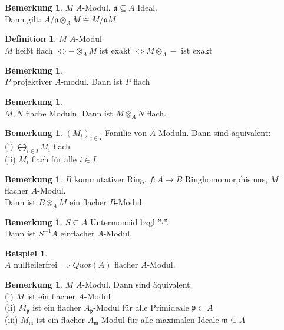 \documentclass[10pt,a4paper,numbers=endperiod]{scrreprt}
\theoremstyle{definition}
\newtheorem{defi}[satz]{Definition}
\newtheorem{bem}[satz]{Bemerkung}
\newtheorem{bsp}[satz]{Beispiel}
\begin{document}
\begin{bem}
	$M$ $A$-Modul, $\mathfrak{a} \subseteq A$ Ideal.\\
	Dann gilt: $A/\mathfrak{a} \otimes_A M \cong M/\mathfrak{a}M$
\end{bem}

\begin{defi}
	$M$ $A$-Modul\\
	$M$ heißt flach $\Leftrightarrow -\otimes_AM$ ist exakt $\Leftrightarrow M \otimes_A-$ ist exakt
\end{defi}

\begin{bem}
	$ $\\
	$P$ projektiver $A$-modul. Dann ist $P$ flach
\end{bem}

\begin{bem}
	$ $\\
	$M, N$ flache Moduln. Dann ist $M \otimes_A N$ flach.
\end{bem}

\begin{bem}
	$(M_i)_{i \in I}$ Familie von $A$-Moduln. Dann sind äquivalent:\\
	(i) $\bigoplus_{i \in I} M_i$ flach\\
	(ii) $M_i$ flach für alle $i \in I$
\end{bem}

\begin{bem}
	$B$ kommutativer Ring, $f: A \to B$ Ringhomomorphismus, $M$ flacher $A$-Modul.\\
	Dann ist $B \otimes_A M$ ein flacher $B$-Modul.
\end{bem}

\begin{bem}
	$S \subseteq A$ Untermonoid bzgl ''$\cdot$''.\\
	Dann ist $S^{-1}A$ einflacher $A$-Modul.
\end{bem}

\begin{bsp}
	$ $\\
	$A$ nullteilerfrei $\Rightarrow Quot(A)$ flacher $A$-Modul.
\end{bsp}

\begin{bem}
	$M$ $A$-Modul. Dann sind äquivalent:\\
	(i) $M$ ist ein flacher $A$-Modul\\
	(ii) $M_\mathfrak{p}$ ist ein flacher $A_\mathfrak{p}$-Modul für alle Primideale $\mathfrak{p} \subset A$\\
	(iii) $M_\mathfrak{m}$ ist ein flacher $A_\mathfrak{m}$-Modul für alle maximalen Ideale $\mathfrak{m} \subseteq A$
\end{bem}
\end{document}
